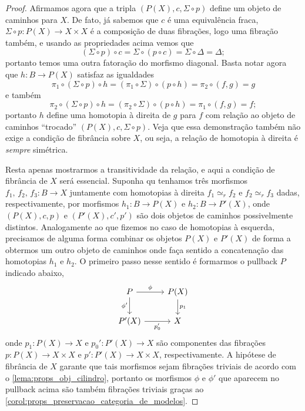 \begin{proof}
  Afirmamos agora que a tripla $(P(X),c,\Sigma \circ p)$ define um objeto de caminhos para $X$.
  De fato, já sabemos que $c$ é uma equivalência fraca, $\Sigma \circ p: P(X) \to X \times X$ é a composição de duas fibrações, logo uma fibração também, e usando as propriedades acima vemos que
  \begin{displaymath}
    (\Sigma \circ p) \circ c = \Sigma \circ (p \circ c) = \Sigma \circ \Delta = \Delta;
  \end{displaymath}
  portanto temos uma outra fatoração do morfismo diagonal.
  Basta notar agora que $h: B \to P(X)$ satisfaz as igualdades
  \begin{displaymath}
    \pi_{1} \circ (\Sigma \circ p) \circ h = (\pi_{1} \circ \Sigma) \circ (p \circ h) = \pi_{2} \circ (f,g) = g
  \end{displaymath}
  e também
  \begin{displaymath}
    \pi_{2} \circ (\Sigma \circ p) \circ h = (\pi_{2} \circ \Sigma) \circ (p \circ h) = \pi_{1} \circ (f,g) = f;
  \end{displaymath}
  portanto $h$ define uma homotopia à direita de $g$ para $f$ com relação ao objeto de caminhos ``trocado'' $(P(X),c, \Sigma \circ p)$.
  Veja que essa demonstração também não exige a condição de fibrância sobre $X$, ou seja, a relação de homotopia à direita é \emph{sempre} simétrica.

  Resta apenas mostrarmos a transitividade da relação, e aqui a condição de fibrância de $X$ será essencial.
  Suponha qu tenhamos três morfismos $f_{1},\, f_{2},\, f_{3}: B \to X$ juntamente com homotopias à direita $f_{1} \simeq_{r} f_{2}$ e $f_{2} \simeq_{r} f_{3}$ dadas, respectivamente, por morfismos $h_{1}: B \to P(X)$ e $h_{2}: B \to P'(X)$, onde $(P(X),c,p)$ e $(P'(X),c',p')$ são dois objetos de caminhos possivelmente distintos.
  Analogamente ao que fizemos  no caso de homotopias à esquerda, precisamos de alguma forma combinar os objetos $P(X)$ e $P'(X)$ de forma a obtermos um outro objeto de caminhos onde faça sentido a concatenação das homotopias $h_{1}$ e $h_{2}$.
  O primeiro passo nesse sentido é formarmos o pullback $P$ indicado abaixo,
  \begin{displaymath}
    \begin{tikzcd}
      P
      \arrow[r, "\phi"]
      \arrow[d, "\phi'" swap]
      & P(X)
      \arrow[d, "p_{1}"]
      \\ P'(X)
      \arrow[r, "p_{0}'" swap]
      & X
    \end{tikzcd}
  \end{displaymath}
  onde $p_{1}: P(X) \to X$ e $p_{0}': P'(X) \to X$ são componentes das fibrações $p: P(X) \to X \times X$ e $p': P'(X) \to X \times X$, respectivamente.
  A hipótese de fibrância de $X$ garante que tais morfismos sejam fibrações triviais de acordo com o \cref{lema:props_obj_cilindro}, portanto os morfismos $\phi$ e $\phi'$ que aparecem no pullback acima são também fibrações triviais graças ao \cref{corol:props_preservacao_categoria_de_modelos}.


\end{proof}
